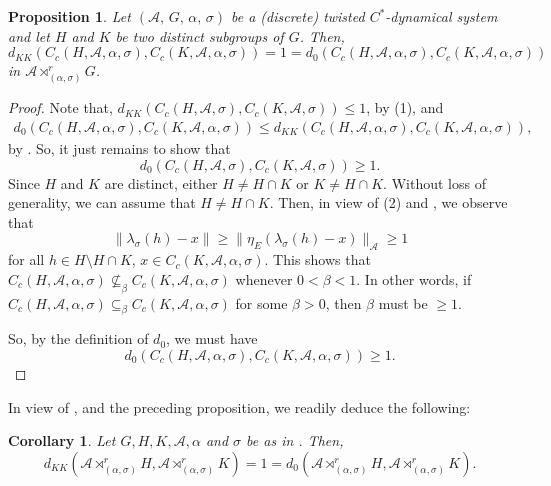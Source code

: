 \documentclass{amsart}
\numberwithin{equation}{section}
\newcommand{\1}{\mathbf{1}}
\newcommand{\mA}{\mathcal{A}}
\newtheorem{cor}[theorem]{Corollary}
\newtheorem{proposition}[theorem]{Proposition}
\begin{document}
\begin{proposition}\label{sg-distance}
Let $(\mA,\,G,\,\alpha,\,\sigma)$ be a (discrete) twisted
$C^*$-dynamical system and let $H$ and $K$ be two distinct
subgroups of $G$. Then,
\[
d_{KK}(C_{c}(H,\mA,\alpha, \sigma), C_{c}(K,\mA,\alpha, \sigma))= 1=
d_{0}(C_{c}(H,\mA,\alpha, \sigma), C_{c}(K,\mA,\alpha,\sigma))
\]
in $\mA \rtimes^{r}_{(\alpha,\sigma)}G$.
\end{proposition}
\begin{proof}
Note that, $d_{KK}(C_{c}(H,\mA,\sigma), C_{c}(K,\mA,\sigma))\leq 1$,
by (1), and
\begin{eqnarray*}
d_{0}(C_{c}(H,\mA,\alpha,\sigma), C_{c}(K,\mA,\alpha, \sigma))\leq
d_{KK}(C_{c}(H,\mA,\alpha, \sigma), C_{c}(K,\mA,\alpha, \sigma)),
\end{eqnarray*}
 by  . So, it just remains  to show that
\[ d_{0}(C_c(H, \mA, \sigma),C_c(K, \mA, \sigma)) \geq 1.
\]
Since $H$ and $K$ are distinct, either $H \neq H \cap K$
or $K \neq H \cap K$.  Without loss of generality, we can assume that
$H\neq H\cap K$. Then, in view of
(2) and , we observe that
\[
\|\lambda_{\sigma}(h) - x\|\geq \|\eta_{E}(\lambda_{\sigma}(h) -
x)\|_{\mA} \geq 1 
\]
for all $h \in H \setminus H \cap K$, $x \in C_c(K, \mA,\alpha,
\sigma)$.
 This shows that $C_c(H, \mA,\alpha,
\sigma) \nsubseteq_{\beta} C_c(K, \mA,\alpha, \sigma)$ whenever $0< \beta < 1$.
In other words, if  $C_c(H, \mA,\alpha,
\sigma) \subseteq_{\beta} C_c(K, \mA,\alpha, \sigma)$ for some $\beta
> 0$, then $\beta$ must be $ \geq 1$.




So, by the definition of $d_0$, we must
have
  \[
  d_{0}(C_c(H, \mA,\alpha, \sigma), C_c(K, \mA,\alpha,\sigma)) \geq 1.
  \]
\end{proof}
In view of ,  and the preceding
proposition, we readily deduce the following:
\begin{cor}
Let $G, H, K, \mA,\alpha$ and $\sigma$ be as in . Then,
\[
d_{KK}(\mA \rtimes^{r}_{(\alpha,\sigma)}H, \mA \rtimes^{r}_{(\alpha,\sigma)}K)=1= d_{0}(\mA \rtimes^{r}_{(\alpha,\sigma)}H, \mA \rtimes^{r}_{(\alpha,\sigma)}K).
\]
\end{cor} 
\end{document}
